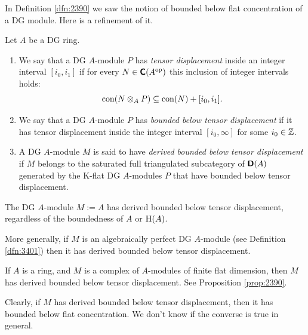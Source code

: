 In Definition \ref{dfn:2390} we saw the notion of bounded below flat 
concentration of a DG module. Here is a refinement of it. 

\begin{dfn} \label{dfn:4341}
Let $A$ be a DG ring. 
\begin{enumerate}
\item We say that a DG $A$-module $P$ has 
{\em tensor displacement}%
inside an integer interval $[i_0, i_1]$ if for every 
$N \in \boldsymbol{\mathsf{C}}(A^{\mathrm{op}})$ this inclusion of integer intervals holds:
\[ \operatorname{con}(N \otimes_A P) \subseteq \operatorname{con}(N) + [i_0, i_1] . \]

\item We say that a DG $A$-module $P$ has
{\em bounded below tensor displacement}%
if it has tensor displacement inside 
the integer interval $[i_0, \infty]$ for some $i_0 \in \mathbb{Z}$. 

\item A DG $A$-module $M$ is said to have 
{\em derived bounded below tensor displacement}%
if $M$ belongs to the saturated full triangulated subcategory of 
$\boldsymbol{\mathsf{D}}(A)$ generated by the K-flat DG $A$-modules $P$ that have bounded 
below tensor displacement.
\end{enumerate}
\end{dfn}


\begin{exa} \label{exa:4601}
The DG $A$-module $M := A$ has derived bounded below tensor displacement, 
regardless of the boundedness of $A$ or $\operatorname{H}(A)$.

More generally, if $M$ is an algebraically perfect DG $A$-module (see 
Definition \ref{dfn:3401}) then it has derived bounded below tensor 
displacement.
\end{exa}

\begin{exa}  \label{exa:4473}
If $A$ is a ring, and $M$ is a complex of $A$-modules of finite flat dimension, 
then $M$ has derived bounded below tensor displacement.
See Proposition \ref{prop:2390}. 
\end{exa}

\begin{rem} \label{rem:4471} 
Clearly, if $M$ has derived bounded below tensor displacement, then it has 
bounded below flat concentration.
We don't know if the converse is true in general. 
\end{rem}

